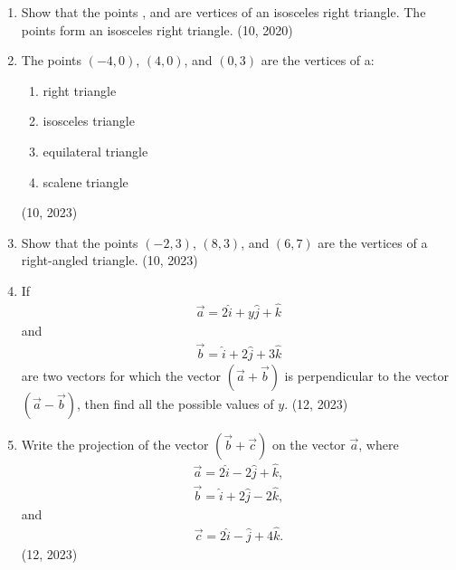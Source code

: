 \begin{enumerate}[label=\thesubsection.\arabic*, ref=\thesubsection.\theenumi]
\item Show that the points ,  and  are vertices of an isosceles right triangle.
The points form an isosceles right triangle.
\hfill (10, 2020)
    \item The points $(-4,0)$, $(4,0)$, and $(0,3)$ are the vertices of a:
    \begin{enumerate}
        \item right triangle
        \item isosceles triangle
        \item equilateral triangle
        \item scalene triangle
    \end{enumerate}
    \hfill (10, 2023)
    \item Show that the points $(-2,3)$, $(8,3)$, and $(6,7)$ are the vertices of a right-angled triangle.
    \hfill (10, 2023)
    \item If
    \begin{align}
        \overrightarrow{a} = 2\hat{i} + y\hat{j} + \hat{k}
    \end{align}
    and
    \begin{align}
        \overrightarrow{b} = \hat{i} + 2\hat{j} + 3\hat{k}
    \end{align}
    are two vectors for which the vector $(\overrightarrow{a} + \overrightarrow{b})$ is perpendicular to the vector $(\overrightarrow{a} - \overrightarrow{b})$, then find all the possible values of $y$.
    \hfill (12, 2023)
    \item Write the projection of the vector $(\overrightarrow{b} + \overrightarrow{c})$ on the vector $\overrightarrow{a}$, where
    \begin{align}
        \overrightarrow{a} = 2\hat{i} - 2\hat{j} + \hat{k},
    \end{align}
    \begin{align}
        \overrightarrow{b} = \hat{i} + 2\hat{j} - 2\hat{k},
    \end{align}
    and
    \begin{align}
        \overrightarrow{c} = 2\hat{i} - \hat{j} + 4\hat{k}.
    \end{align}
    \hfill (12, 2023)


\end{enumerate}
